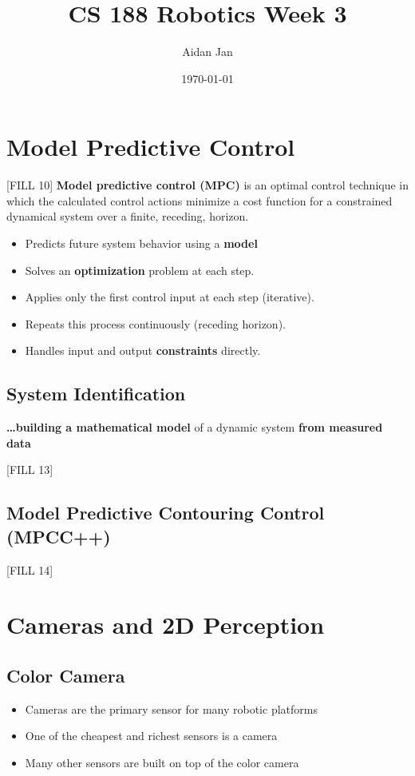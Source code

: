 \documentclass[10pt]{article}
\title{CS 188 Robotics Week 3}
\author{Aidan Jan}
\date{\today}
\begin{document}
\maketitle 

\section*{Model Predictive Control}
[FILL 10]
\textbf{Model predictive control (MPC)} is an optimal control technique in which the calculated control actions minimize a cost function for a constrained dynamical system over a finite, receding, horizon.
\begin{itemize}
	\item Predicts future system behavior using a \textbf{model}
	\item Solves an \textbf{optimization} problem at each step.
	\item Applies only the first control input at each step (iterative).
	\item Repeats this process continuously (receding horizon).
	\item Handles input and output \textbf{constraints} directly.
\end{itemize}

\subsection*{System Identification}
\textbf{\dots building a mathematical model} of a dynamic system \textbf{from measured data}

[FILL 13]

\subsection*{Model Predictive Contouring Control (MPCC++)}
[FILL 14]

\section*{Cameras and 2D Perception}
\subsection*{Color Camera}
\begin{itemize}
	\item Cameras are the primary sensor for many robotic platforms
	\item One of the cheapest and richest sensors is a camera
	\item Many other sensors are built on top of the color camera
\end{itemize}
\end{document}
